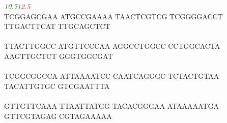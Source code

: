 \documentclass[11pt,twoside,reqno,a4paper]{article}
\begin{document}
{\hspace*{2\charwidth}\textit{\textcolor{Green}{10.7}}\hspace*{1\charwidth}\hspace*{1\charwidth}\hspace*{1\charwidth}\hspace*{-98\charwidth}\textit{\textcolor{Brown}{12.5}}\hspace*{1\charwidth}\hspace*{1\charwidth}\hspace*{1\charwidth}\hspace*{1\charwidth}\\
TCGGAGCGAA	ATGCCGAAAA	TAACTCGTCG	TCGGGGACCT	TTGACTTCAT	TTGCAGCTCT	\\
\hspace*{1\charwidth}\hspace*{1\charwidth}\hspace*{1\charwidth}\hspace*{1\charwidth}\hspace*{1\charwidth}\hspace*{1\charwidth}\\
TTACTTGGCC	ATGTTCCCAA	AGGCCTGGCC	CCTGGCACTA	AAGTTGCTCT	GGGTGGCGAT	\\
\hspace*{1\charwidth}\hspace*{1\charwidth}\hspace*{1\charwidth}\hspace*{1\charwidth}\hspace*{1\charwidth}\hspace*{1\charwidth}\\
TCGGCGGCCA	ATTAAAATCC	CAATCAGGGC	TCTACTGTAA	TACATTGTGC	GTCGAATTTA	\\
\hspace*{1\charwidth}\hspace*{1\charwidth}\hspace*{1\charwidth}\hspace*{1\charwidth}\hspace*{1\charwidth}\hspace*{1\charwidth}\\
GTTGTTCAAA	TTAATTATGG	TACACGGGAA	ATAAAAATGA	GTTCGTAGAG	CGTAGAAAAA	\\
\hspace*{1\charwidth}\hspace*{1\charwidth}\hspace*{1\charwidth}\hspace*{1\charwidth}\hspace*{1\charwidth}\hspace*{1\charwidth}\\
\\
\\
\\
\\
\\
\\
\\
\\
\\
\\
}
\end{document}
